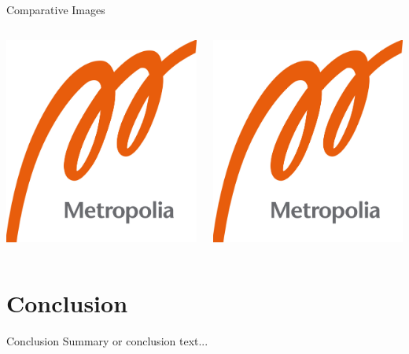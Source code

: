 \documentclass{beamer}
\begin{document}
\begin{frame}{Comparative Images}
  \begin{columns}[T] %
%
    \begin{column}{.48\textwidth} %
      \centering
      \includegraphics[width=0.8\linewidth]{logo.png} %
    \end{column}
%
    \begin{column}{.48\textwidth} %
      \centering
      \includegraphics[width=0.8\linewidth]{logo.png} %
    \end{column}
%
  \end{columns}
\end{frame}


\section{Conclusion}
\begin{frame}{Conclusion}
  Summary or conclusion text...
\end{frame}
\end{document}

